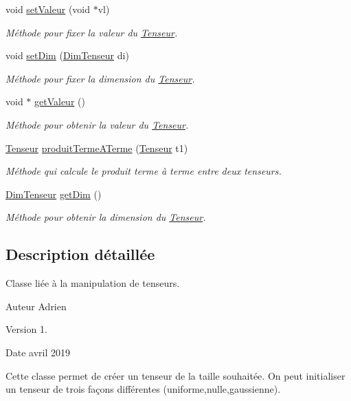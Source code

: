 \begin{DoxyCompactItemize}
void \hyperlink{class_tenseur_add5cd51caa3aae69a44dc3f0bc2b9170}{set\+Valeur} (void $\ast$vl)
\begin{DoxyCompactList}\small\item\em Méthode pour fixer la valeur du \hyperlink{class_tenseur}{Tenseur}. \end{DoxyCompactList}\item 
void \hyperlink{class_tenseur_a161be386a5d179f538234fceb152e80a}{set\+Dim} (\hyperlink{class_dim_tenseur}{Dim\+Tenseur} di)
\begin{DoxyCompactList}\small\item\em Méthode pour fixer la dimension du \hyperlink{class_tenseur}{Tenseur}. \end{DoxyCompactList}\item 
void $\ast$ \hyperlink{class_tenseur_abf24ad6abb135909d0ec82142da47188}{get\+Valeur} ()
\begin{DoxyCompactList}\small\item\em Méthode pour obtenir la valeur du \hyperlink{class_tenseur}{Tenseur}. \end{DoxyCompactList}\item 
\hyperlink{class_tenseur}{Tenseur} \hyperlink{class_tenseur_a616b8fc8cfee2c3f601c567ba42c7422}{produit\+Terme\+A\+Terme} (\hyperlink{class_tenseur}{Tenseur} t1)
\begin{DoxyCompactList}\small\item\em Méthode qui calcule le produit terme à terme entre deux tenseurs. \end{DoxyCompactList}\item 
\hyperlink{class_dim_tenseur}{Dim\+Tenseur} \hyperlink{class_tenseur_a84d2bb71deb6f4998327f6c9309c1ed4}{get\+Dim} ()
\begin{DoxyCompactList}\small\item\em Méthode pour obtenir la dimension du \hyperlink{class_tenseur}{Tenseur}. \end{DoxyCompactList}\end{DoxyCompactItemize}


\subsection{Description détaillée}
Classe liée à la manipulation de tenseurs. 

\begin{DoxyAuthor}{Auteur}
Adrien 
\end{DoxyAuthor}
\begin{DoxyVersion}{Version}
1. 
\end{DoxyVersion}
\begin{DoxyDate}{Date}
avril 2019
\end{DoxyDate}
Cette classe permet de créer un tenseur de la taille souhaitée. On peut initialiser un tenseur de trois façons différentes (uniforme,nulle,gaussienne). 

